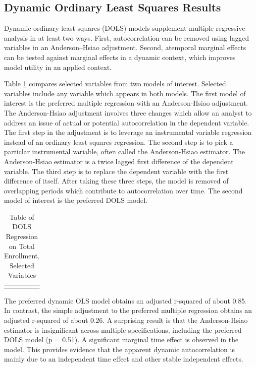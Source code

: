 \documentclass[review]{elsarticle}
\begin{document}
    \subsection{Dynamic Ordinary Least Squares Results}

    Dynamic ordinary least squares (DOLS) models supplement multiple regressive analysis in at least two ways.
    First, autocorrelation can be removed using lagged variables in an Anderson–Hsiao adjustment\cite{anderson1981estimation}.
    Second, atemporal marginal effects can be tested against marginal effects in a dynamic context,
    which improves model utility in an applied context.

    Table \ref{tab:table_dols} compares selected variables from two models of interest.
    Selected variables include any variable which appears in both models.
    The first model of interest is the preferred multiple regression with an Anderson-Hsiao adjustment.
    The Anderson-Hsiao adjustment involves three changes which allow an analyst to address an issue of actual or potential autocorrelation in the dependent variable.
    The first step in the adjustment is to leverage an instrumental variable regression instead of an ordinary least squares regression.
    The second step is to pick a particlar instrumental variable, often called the Anderson-Hsiao estimator.
    The Anderson-Hsiao estimator is a twice lagged first difference of the dependent variable.
    The third step is to replace the dependent variable with the first difference of itself.
    After taking these three steps, the model is removed of overlapping periods which contribute to autocorrelation over time.
    The second model of interest is the preferred DOLS model.
    
    \begin{table}
        \caption{Table of DOLS Regression on Total Enrollment, Selected Variables}
        \begin{tabularx}{\textwidth}{X}
            \centering
            
        \end{tabularx}
        \label{tab:table_dols}
        \end{table}

    The preferred dynamic OLS model obtains an adjusted r-squared of about 0.85.
    In contrast, the simple adjustment to the preferred multiple regression
    obtains an adjusted r-squared of about 0.26.
    A surprising result is that the Anderson-Hsiao estimator is insignificant
    across multiple specifications, including the preferred DOLS model (p = 0.51).
    A significant marginal time effect is observed in the model.
    This provides evidence that the apparent dynamic autocorrelation is
    mainly due to an independent time effect and other stable independent effects.
    
\end{document}
